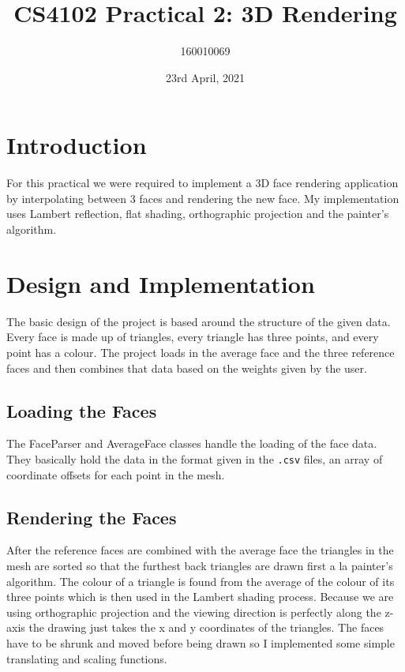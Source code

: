 \documentclass{article}
\begin{document}
\title{CS4102 Practical 2: 3D Rendering}
\author{160010069}
\date{23rd April, 2021}

\begin{titlepage}
    \maketitle
    \tableofcontents
\end{titlepage}

\section{Introduction}
For this practical we were required to implement a 3D 
face rendering application by interpolating between 3 
faces and rendering the new face. My implementation uses 
Lambert reflection, flat shading, orthographic projection 
and the painter's algorithm.  

\section{Design and Implementation}
The basic design of the project is based around the 
structure of the given data. Every face 
is made up of triangles, every triangle 
has three points, and every point has a colour. 
The project loads in the average face and the three 
reference faces and then combines that data 
based on the weights given by the user. 

\subsection{Loading the Faces}
The FaceParser and AverageFace classes handle the loading 
of the face data. They basically hold the data in 
the format given in the \verb+.csv+ files,
an array of coordinate offsets for each point in the 
mesh. 

\subsection{Rendering the Faces}
After the reference faces are combined with the 
average face the triangles in the mesh are sorted 
so that the furthest back triangles are drawn first 
a la painter's algorithm. The colour of a triangle 
is found from the average of the colour of its three points 
which is then used in the Lambert shading process. Because we are 
using orthographic projection and the viewing direction is 
perfectly along the z-axis the drawing just takes the 
x and y coordinates of the triangles. The faces 
have to be shrunk and moved before being drawn 
so I implemented some simple translating and 
scaling functions. 
\end{document}
